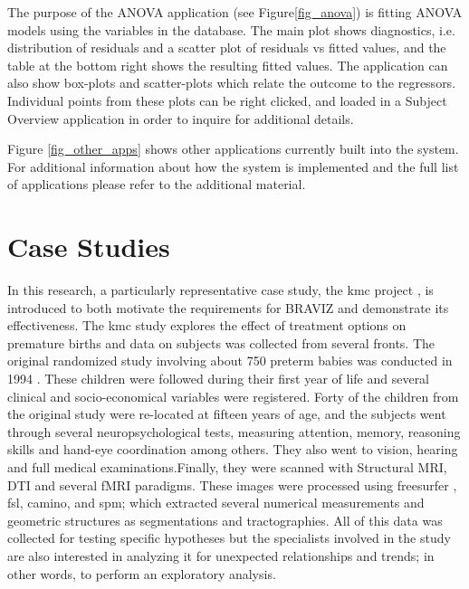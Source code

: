 \documentclass[utf8,paper]{frontiersSCNS} %
\begin{document}
The purpose of the ANOVA application (see Figure\ref{fig_anova}) is fitting ANOVA models using the variables in the database.  The main plot shows diagnostics, i.e. distribution of residuals and a scatter plot of residuals vs fitted values, and the table at the bottom right shows the resulting fitted values. The application can also show box-plots and scatter-plots which relate the outcome to the regressors. Individual points from these plots can be right clicked, and loaded in a Subject Overview application in order to inquire for additional details.

Figure \ref{fig_other_apps} shows other applications currently built into the system. For additional information about how the system is implemented and the full list of applications please refer to the additional material.

\section{Case Studies}

In this research, a particularly representative case study, the kmc project \citep{schneider_cerebral_2012}, is introduced to both motivate the requirements for BRAVIZ and demonstrate its effectiveness. The kmc study explores the effect of treatment options on premature births and data on subjects was collected from several fronts. The original randomized study involving about 750 preterm babies was conducted in 1994 \citep{charpak_kangaroo_1997}. These children were followed during their first year \citep{charpak_randomized_2001, tessier_kangaroo_2009} of life and several clinical and socio-economical variables were registered. Forty of the children from the original study were re-located at fifteen years of age, and the subjects went through several neuropsychological tests, measuring attention, memory, reasoning skills and hand-eye coordination among others. They also went to vision, hearing and full medical examinations.Finally, they were scanned with Structural MRI, DTI and several fMRI paradigms. These images were processed using freesurfer \citep{fischl_freesurfer_2012}, fsl\citep{jenkinson_fsl_2012}, camino\citep{cook_camino:_2006}, and spm\citep{friston_statistical_2006}; which extracted several numerical measurements and geometric structures as segmentations and tractographies. All of this data was collected for testing specific hypotheses but the specialists involved in the study are also interested in analyzing it for unexpected relationships and trends; in other words, to perform an exploratory analysis.
\end{document}
